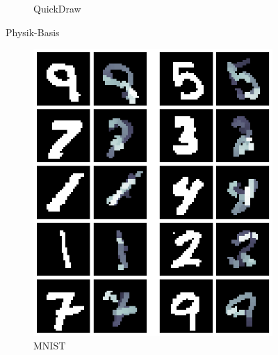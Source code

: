 \begin{figure}[!ht]
\begin{subfigure}[b]{0.3\textwidth}
        \caption{QuickDraw}
    \end{subfigure}
    \caption{Physik-Basis}
    \label{fig:Physik-Basis}
\end{figure}

\begin{figure}[!ht]
    \centering
    \begin{subfigure}[b]{0.3\textwidth}
        \centering
        \includegraphics[width=\textwidth]{images/resultate/physics-speed-mnist.png}
        \caption{MNIST}
    \end{subfigure}
    \begin{subfigure}[b]{0.3\textwidth}
        \centering

\end{subfigure}
\end{figure}
